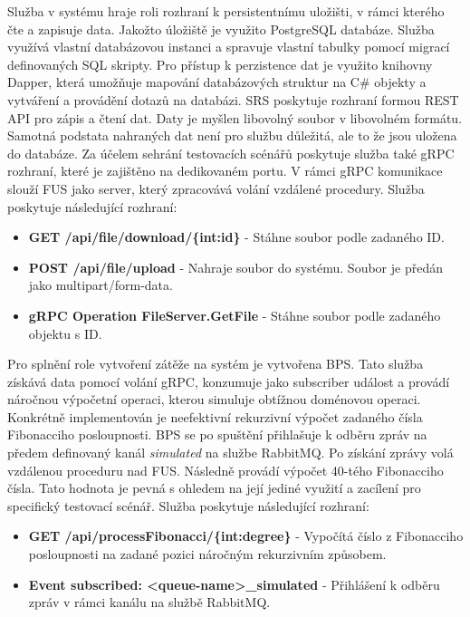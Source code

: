 
Služba v systému hraje roli rozhraní k persistentnímu uložišti, v rámci kterého čte a zapisuje data. Jakožto úložiště je využito PostgreSQL databáze. Služba využívá vlastní databázovou instanci a spravuje vlastní tabulky pomocí migrací definovaných SQL skripty. Pro přístup k perzistence dat je využito knihovny Dapper, která umožňuje mapování databázových struktur na C\# objekty a vytváření a provádění dotazů na databázi. SRS poskytuje rozhraní formou REST API pro zápis a čtení dat. Daty je myšlen libovolný soubor v libovolném formátu. Samotná podstata nahraných dat není pro službu důležitá, ale to že jsou uložena do databáze. Za účelem sehrání testovacích scénářů poskytuje služba také gRPC rozhraní, které je zajištěno na dedikovaném portu. V rámci gRPC komunikace slouží FUS jako server, který zpracovává volání vzdálené procedury. Služba poskytuje následující rozhraní:

\begin{itemize}
    \item \textbf{GET /api/file/download/\{int:id\}} - Stáhne soubor podle zadaného ID.
    \item \textbf{POST /api/file/upload} - Nahraje soubor do systému. Soubor je předán jako multipart/form-data.
    \item \textbf{gRPC Operation FileServer.GetFile} - Stáhne soubor podle zadaného objektu s ID.
\end{itemize}


Pro splnění role vytvoření zátěže na systém je vytvořena BPS. Tato služba získává data pomocí volání gRPC, konzumuje jako subscriber událost a provádí náročnou výpočetní operaci, kterou simuluje obtížnou doménovou operaci. Konkrétně implementován je neefektivní rekurzivní výpočet zadaného čísla Fibonacciho posloupnosti. BPS se po spuštění přihlašuje k odběru zpráv na předem definovaný kanál \emph{simulated} na službe RabbitMQ. Po získání zprávy volá vzdálenou proceduru nad FUS. Následně provádí výpočet 40-tého Fibonacciho čísla. Tato hodnota je pevná s ohledem na její jediné využití a zacílení pro specifický testovací scénář. Služba poskytuje následující rozhraní:

\begin{itemize}
    \item \textbf{GET /api/processFibonacci/\{int:degree\}} - Vypočítá číslo z Fibonacciho posloupnosti na zadané pozici náročným rekurzivním způsobem.
    \item \textbf{Event subscribed: <queue-name>\_simulated} - Přihlášení k odběru zpráv v rámci kanálu na službě RabbitMQ.
\end{itemize}


